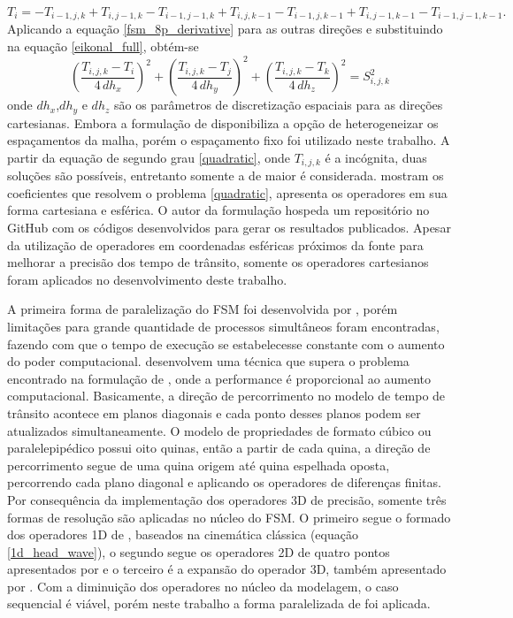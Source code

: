 \begin{equation}
	T_i = - T_{i-1,j,k} + T_{i,j-1,k} - T_{i-1,j-1,k} + T_{i,j,k-1} - T_{i-1,j,k-1} + T_{i,j-1,k-1} - T_{i-1,j-1,k-1}.
\end{equation} 
\noindent Aplicando a equação \ref{fsm_8p_derivative} para as outras direções e substituindo na equação \ref{eikonal_full}, obtém-se
\begin{equation}
	\left(\dfrac{T_{i,j,k} - T_i}{4\,dh_x}\right)^2 + \left(\dfrac{T_{i,j,k} - T_j}{4\,dh_y}\right)^2 + \left(\dfrac{T_{i,j,k} - T_k}{4\,dh_z}\right)^2 = S^2_{i,j,k}
	\label{quadratic}
\end{equation}
\noindent onde $dh_x$,$dh_y$ e $dh_z$ são os parâmetros de discretização espaciais para as direções cartesianas. Embora a formulação de  disponibiliza a opção de heterogeneizar os espaçamentos da malha, porém o espaçamento fixo foi utilizado neste trabalho. A partir da equação de segundo grau \ref{quadratic}, onde $T_{i,j,k}$ é a incógnita, duas soluções são possíveis, entretanto somente a de maior é considerada.  mostram os coeficientes que resolvem o problema \ref{quadratic}, apresenta os operadores em sua forma cartesiana e esférica. O autor da formulação hospeda um repositório no GitHub com os códigos desenvolvidos para gerar os resultados publicados. Apesar da utilização de operadores em coordenadas esféricas próximos da fonte para melhorar a precisão dos tempo de trânsito, somente os operadores cartesianos foram aplicados no desenvolvimento deste trabalho.        

A primeira forma de paralelização do FSM foi desenvolvida por , porém limitações para grande quantidade de processos simultâneos foram encontradas, fazendo com que o tempo de execução se estabelecesse constante com o aumento do poder computacional.  desenvolvem uma técnica que supera o problema encontrado na formulação de , onde a performance é proporcional ao aumento computacional. Basicamente, a direção de percorrimento no modelo de tempo de trânsito acontece em planos diagonais e cada ponto desses planos podem ser atualizados simultaneamente. O modelo de propriedades de formato cúbico ou paralelepipédico possui oito quinas, então a partir de cada quina, a direção de percorrimento segue de uma quina origem até quina espelhada oposta, percorrendo cada plano diagonal e aplicando os operadores de diferenças finitas. Por consequência da implementação dos operadores 3D de precisão, somente três formas de resolução são aplicadas no núcleo do FSM. O primeiro segue o formado dos operadores 1D de , baseados na cinemática clássica (equação \ref{1d_head_wave}), o segundo segue os operadores 2D de quatro pontos apresentados por  e o terceiro é a expansão do operador 3D, também apresentado por . Com a diminuição dos operadores no núcleo da modelagem, o caso sequencial é viável, porém neste trabalho a forma paralelizada de  foi aplicada.  

